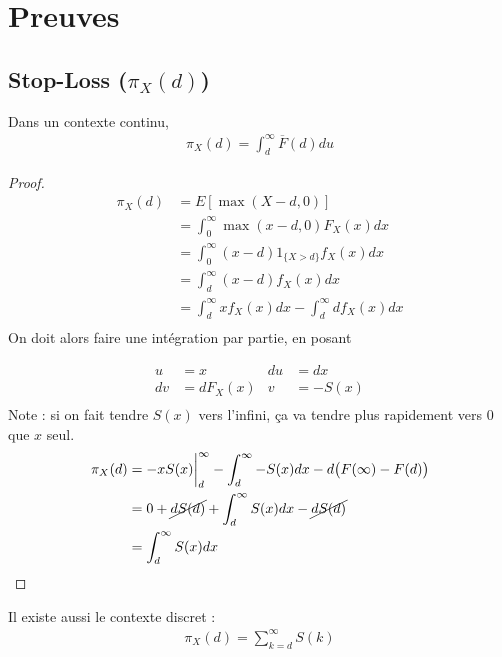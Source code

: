 
\chapter{Preuves}
\section{Stop-Loss ($\pi_X(d)$)}
\label{preuve:stoploss}
Dans un contexte continu,
\begin{align*}
\pi_X(d) = \int_d^\infty \overline{F}(d) du
\end{align*}

\begin{proof}
\begin{align*}
\pi_X(d)		& = E[\max(X-d,0)] \\
	& = \int_0^\infty \max(x - d, 0) F_X(x) dx \\
	& = \int_0^\infty (x-d) 1_{\{X > d \}} f_X(x) dx \\
	& = \int_d^\infty (x-d) f_X(x) dx \\
	& = \int_d^\infty x f_X(x) dx - \int_d^\infty d f_X(x) dx \\
\end{align*}
On doit alors faire une intégration par partie, en posant

\begin{displaymath}
\begin{aligned}
u	& = x		& du	 & = dx \\
dv	& = dF_X(x)	& v	 & = -S(x) \\	
\end{aligned}
\end{displaymath}
Note : si on fait tendre $S(x)$ vers l'infini, ça va tendre plus rapidement vers 0 que $x$ seul.
\begin{align*}
\pi_X(d)	& = -xS(x) \biggr \rvert_d^\infty - \int_d^\infty - S(x) dx - d \big(F(\infty) - F(d) \big) \\
	& = 0 + \cancel{dS(d)} + \int_d^\infty S(x) dx - \cancel{dS(d)} \\
	& = \int_d^\infty S(x) dx \\
\end{align*}
\end{proof}
Il existe aussi le contexte discret : 
\begin{align*}
\pi_X(d) = \sum_{k=d}^\infty S(k)
\end{align*}
